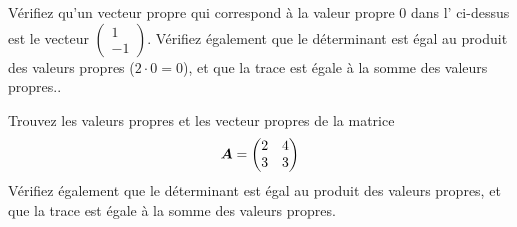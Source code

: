 \begin{exerciceB}
Vérifiez qu'un vecteur propre qui correspond à la valeur propre 0 dans
l' ci-dessus est le vecteur $\displaystyle \begin{pmatrix}
1 \\ -1
\end{pmatrix}$.  Vérifiez également que le déterminant est égal au produit
des valeurs propres ($2\cdot 0 = 0$), et que la trace est égale à la somme des valeurs propres..
\end{exerciceB}

\pagebreak[2]
\begin{exerciceB}\label{exercice:propre}
Trouvez les valeurs propres et les vecteur propres de la matrice \[
\boldsymbol{A} = \begin{pmatrix}
2 & 4 \\ 3 & 3
\end{pmatrix}
\]
Vérifiez également que le déterminant est égal au produit
des valeurs propres, et que la trace est égale à la somme des valeurs propres.
\end{exerciceB}

